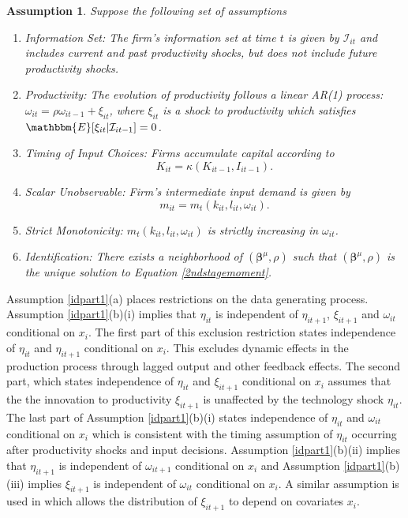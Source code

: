 \documentclass[12pt]{article}
\newtheorem{assump}{Assumption}[section]
\begin{document}
\begin{assump} \label{idpart2}
Suppose the following set of assumptions 
	\begin{enumerate}[label=(\alph*)]
		\item Information Set: The firm's information set at time $t$ is given by $\mathcal{I}_{it}$ and includes current and past productivity shocks, but does not include future productivity shocks.
		\item Productivity: The evolution of productivity follows a linear AR(1) process:\\ 
        $\omega_{it}=\rho\omega_{it-1}+\xi_{it}$, where $\xi_{it}$ is a shock to productivity which satisfies $\mathbbm{E}[\xi_{it}|\mathcal{I}_{it-1}]=0$. 
		\item Timing of  Input Choices: Firms accumulate capital according to
		\begin{equation*}
		K_{it}=\kappa(K_{it-1}, I_{it-1}).
		\end{equation*}
		\item Scalar Unobservable: Firm's intermediate input demand is given by
		\begin{equation*}
		m_{it}=m_{t}(k_{it}, l_{it}, \omega_{it}).
		\end{equation*}
		\item Strict Monotonicity: $m_{t}(k_{it}, l_{it}, \omega_{it})$ is strictly increasing in $\omega_{it}$.
        \item Identification: There exists a neighborhood of $(\boldsymbol{\beta}^{\mu}, \rho)$ such that  $(\boldsymbol{\beta}^{\mu}, \rho)$ is the unique solution to Equation \eqref{2ndstagemoment}.
	\end{enumerate}
\end{assump}

Assumption \ref{idpart1}(a) places restrictions on the data generating process. Assumption \ref{idpart1}(b)(i) implies that $\eta_{it}$ is independent of $\eta_{it+1}$, $\xi_{it+1}$ and $\omega_{it}$ conditional on $x_{i}$. The first part of this exclusion restriction states independence of $\eta_{it}$ and $\eta_{it+1}$ conditional on $x_{i}$. This excludes dynamic effects in the production process through lagged output and other feedback effects. The second part, which states independence of $\eta_{it}$ and $\xi_{it+1}$ conditional on $x_{i}$ assumes that the the innovation to productivity $\xi_{it+1}$ is unaffected by the technology shock $\eta_{it}$. The last part of Assumption \ref{idpart1}(b)(i) states independence of $\eta_{it}$ and $\omega_{it}$ conditional on $x_{i}$ which is consistent with the timing assumption of $\eta_{it}$ occurring after productivity shocks and input decisions. Assumption \ref{idpart1}(b)(ii) implies that $\eta_{it+1}$ is independent of $\omega_{it+1}$ conditional on $x_{i}$ and Assumption \ref{idpart1}(b)(iii) implies $\xi_{it+1}$ is independent of $\omega_{it}$ conditional on $x_{i}$. A similar assumption is used in \cite{Hu2019} which allows the distribution of $\xi_{it+1}$ to depend on covariates $x_{i}$.
\end{document}
